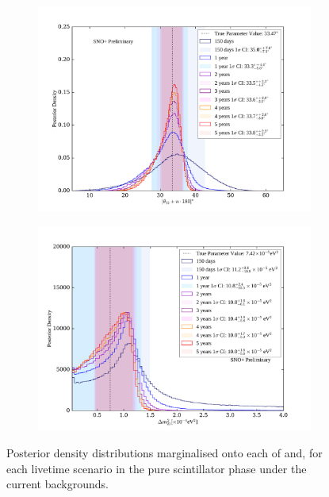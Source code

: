 \begin{figure}
    \centering
    \begin{subfigure}{0.90\textwidth}
        \centering
        \includegraphics[width=\textwidth]{6_SolarAnalysis/images/theta_12_comparison_projections.pdf}
        \caption{}
        \label{fig:1d_posteriors_projections_theta}
    \end{subfigure}
    \begin{subfigure}{0.90\textwidth}
        \centering
        \includegraphics[width=\textwidth]{6_SolarAnalysis/images/dmsq_21_comparison_projections.pdf}
        \caption{}
        \label{fig:1d_posteriors_projections_dmsq}
    \end{subfigure}
    \caption[Posterior density posterior distributions marginalised onto each of \tonetwo{} and \dmsq{}, for each livetime scenario]
        {Posterior density distributions marginalised onto each of \tonetwo{} and\dmsq{}, for each livetime scenario in the pure scintillator phase under the current backgrounds.}
    \label{fig:1d_posteriors_projections}
\end{figure}

